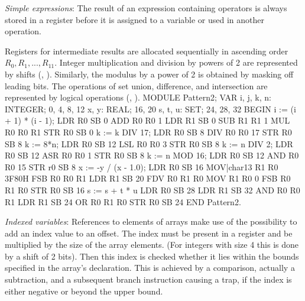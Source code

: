 \noindent {} \emph{Simple expressions}: The result of an expression containing operators is always stored in a register before it is assigned to a variable or used in another operation.

Registers for intermediate results are allocated sequentially in ascending order $R_0, R_1, ... , R_{11}$. Integer multiplication and division by powers of 2 are represented by shifts (, ). Similarly, the modulus by a power of 2 is obtained by masking off leading bits. The operations of set union, difference, and intersection are represented by logical operations (, ).
\begintt
MODULE Pattern2;
  VAR i, j, k, n: INTEGER;      0, 4, 8, 12
    x, y: REAL;                 16, 20
    s, t, u: SET;               24, 28, 32
BEGIN
  i := (i + 1) * (i - 1);       LDR  R0 SB 0
                                ADD  R0 R0 1
                                LDR  R1 SB 0
                                SUB  R1 R1 1
                                MUL  R0 R0 R1
                                STR  R0 SB 0
  k := k DIV 17;                LDR  R0 SB 8
                                DIV  R0 R0 17
                                STR  R0 SB 8
  k := 8*n;                     LDR  R0 SB 12
                                LSL  R0 R0 3
                                STR  R0 SB 8
  k := n DIV 2;                 LDR  R0 SB 12
                                ASR  R0 R0 1
                                STR  R0 SB 8
  k := n MOD 16;                LDR  R0 SB 12
                                AND  R0 R0 15
                                STR  r0 SB 8
  x := -y / (x - 1.0);          LDR  R0 SB 16
                                MOV|char13 R1 R0 3F80H
                                FSB  R0 R0 R1
                                LDR  R1 SB 20
                                FDV  R0 R1 R0
                                MOV  R1 R0 0
                                FSB  R0 R1 R0
                                STR  R0 SB 16
  s := s + t * u                LDR  R0 SB 28
                                LDR  R1 SB 32
                                AND  R0 R0 R1
                                LDR  R1 SB 24
                                OR   R0 R1 R0
                                STR  R0 SB 24
END Pattern2.
\endtt

\noindent {} \emph{Indexed variables}: References to elements of arrays make use of the possibility to add an index value to an offset. The index must be present in a register and be multiplied by the size of the array elements. (For integers with size 4 this is done by a shift of 2 bits). Then this index is checked whether it lies within the bounds specified in the array's declaration. This is achieved by a comparison, actually a subtraction, and a subsequent branch instruction causing a trap, if the index is either negative or beyond the upper bound.


